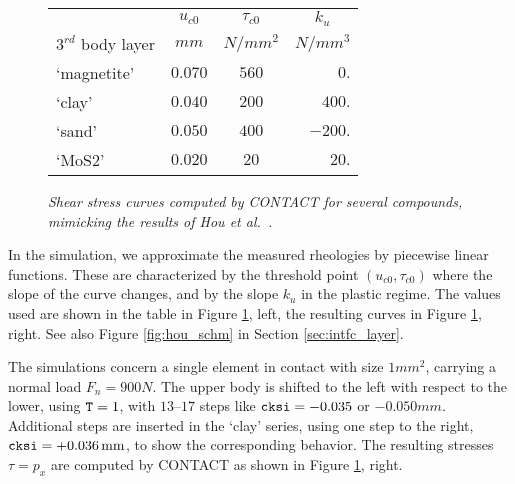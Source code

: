 \documentclass[12pt]{report}
\begin{document}
\begin{figure}[bt]
\centering
\begin{minipage}[t]{0.50\textwidth}
  \vspace{10ex}
  \centering
  \begin{tabular}[b]{|l|ccr|}
  \hline
                       & $u_{c0}$ & $\tau_{c0}$ & \multicolumn{1}{c|}{$k_u$} \\
   $3^{rd}$ body layer &  $mm$ & $N/mm^2$    & $N/mm^3$ \\
  \hline
  `magnetite' & $0.070$ & $560$ & $   0.$ \\
  `clay'      & $0.040$ & $200$ & $ 400.$ \\
  `sand'      & $0.050$ & $400$ & $-200.$ \\
  `MoS2'      & $0.020$ & $ 20$ & $  20.$ \\
  \hline
  \end{tabular}
\end{minipage}
\begin{minipage}[t]{0.49\textwidth}
  \vspace{0pt}
\end{minipage}
\caption{\em Shear stress curves computed by CONTACT for several compounds,
mimicking the results of Hou et al.\ \cite[Fig. 4]{Hou1997}.}
\label{fig:plastic_3bl}
\end{figure}

In the simulation, we approximate the measured rheologies by piecewise
linear functions. These are characterized by the threshold point $(u_{c0},
\tau_{c0})$ where the slope of the curve changes, and by the slope $k_u$ in
the plastic regime. The values used are shown in the table in Figure
\ref{fig:plastic_3bl}, left, the resulting curves in Figure
\ref{fig:plastic_3bl}, right. See also Figure \ref{fig:hou_schm} in Section
\ref{sec:intfc_layer}.

The simulations concern a single element in contact with size $1\unit{mm^2}$,
carrying a normal load $F_n=900\unit{N}$. The upper body is shifted to the left with
respect to the lower, using ${\tt T}=1$, with $13\text{--}17$ steps like
${\tt cksi}= -0.035$ or $-0.050\unit{mm}$. Additional steps are inserted in the
`clay' series, using one step to the right, ${\tt cksi}=+0.036\,\mathrm{mm}$, to
show the corresponding behavior. The resulting stresses $\tau=p_x$ are
computed by CONTACT as shown in Figure \ref{fig:plastic_3bl}, right. 
\end{document}
